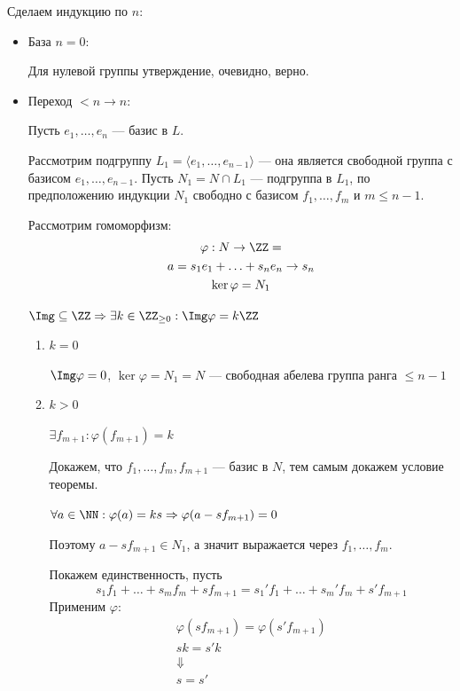 Сделаем индукцию по \( n \):
\begin{itemize}
    \item
        База \( n = 0 \):

        Для нулевой группы утверждение, очевидно, верно.
    \item
        Переход \( < n \to n \):

        Пусть \( e_1, \ldots, e_n \) --- базис в \( L \).

        Рассмотрим подгруппу \( L_1 = \langle e_1, \ldots, e_{n - 1} \rangle \)
        --- она является свободной группа с базисом \( e_1, \ldots, e_{n - 1} \).
        Пусть \( N_1 = N \cap L_1 \) --- подгруппа в \( L_1 \),
        по предположению индукции \( N_1 \) свободно с базисом \( f_1, \ldots, f_m \) и \( m \leq n - 1 \).

        Рассмотрим гомоморфизм:
        \begin{gather*}
            \varphi : N \to \ZZ=
            \\
            a = s_1 e_1 + \ldots + s_n e_n \to s_n
            \\
            \ker \varphi = N_1
        \end{gather*}

        \( \Img \subseteq \ZZ \Rightarrow \exists k \in \ZZ_{\geq 0} : \Img \varphi = k \ZZ \)

        \begin{enumerate}
            \item
                \( k = 0 \)

                \( \Img \varphi = 0 \), \( \ker \varphi = N_1 = N \) --- свободная абелева группа ранга \( \leq n - 1 \)
            \item
                \( k > 0 \)

                \( \exists f_{m + 1} : \varphi(f_{m + 1}) = k \)

                Докажем, что \( f_1, \ldots, f_m, f_{m + 1} \) --- базис в \( N \),
                тем самым докажем условие теоремы.

                \( \forall a \in \NN : \varphi(a) = ks \Rightarrow \varphi(a - s f_{m + 1}) = 0 \)

                Поэтому \( a - s f_{m + 1} \in N_1 \), а значит выражается через \( f_1, \ldots, f_m \).

                Покажем единственность, пусть
                \[
                    s_1 f_1 + \ldots + s_m f_m + s f_{m + 1} = s_1' f_1 + \ldots + s_m' f_m + s' f_{m + 1}
                \]
                Применим \( \varphi \):
                \begin{gather*}
                    \varphi(s f_{m + 1}) = \varphi(s' f_{m + 1})
                    \\
                    sk = s' k
                    \\
                    \Downarrow
                    \\
                    s = s'
                \end{gather*}


\end{enumerate}
\end{itemize}
